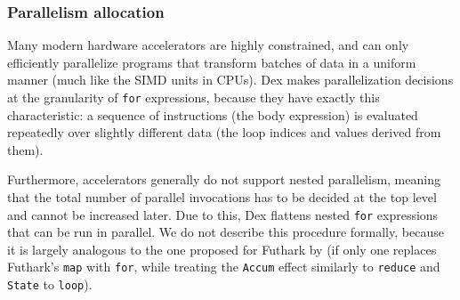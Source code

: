 \documentclass[acmsmall,screen,nonacm]{acmart}
\begin{document}
\subsubsection{Parallelism allocation}
\label{sec:parallelism-traversal}
Many modern hardware accelerators are highly constrained, and can only efficiently parallelize programs that transform batches of data in a uniform manner (much like the SIMD units in CPUs).
Dex makes parallelization decisions at the granularity of \texttt{for} expressions, because they have exactly this characteristic: a sequence of instructions (the body expression) is evaluated repeatedly over slightly different data (the loop indices and values derived from them).

Furthermore, accelerators generally do not support nested parallelism, meaning that the total number of parallel invocations has to be decided at the top level and cannot be increased later.
Due to this, Dex flattens nested \texttt{for} expressions that can be run in parallel.
We do not describe this procedure formally, because it is largely analogous to the one proposed for Futhark by \citet{henriksen2017futhark} (if only one replaces Futhark's \texttt{map} with \texttt{for}, while treating the \texttt{Accum} effect similarly to \texttt{reduce} and \texttt{State} to \texttt{loop}).
\end{document}
